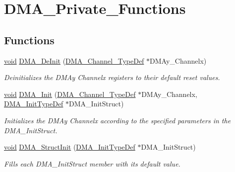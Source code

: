 \hypertarget{group___d_m_a___private___functions}{}\section{D\+M\+A\+\_\+\+Private\+\_\+\+Functions}
\label{group___d_m_a___private___functions}
\subsection*{Functions}
\begin{DoxyCompactItemize}
\item 
\hyperlink{usb__devapi_8h_afabf60e7f57651d6d595a02c75f07cd0}{void} \hyperlink{group___d_m_a___private___functions_ga21ca0d50b13e502db5ab5feb484f9ece}{D\+M\+A\+\_\+\+De\+Init} (\hyperlink{struct_d_m_a___channel___type_def}{D\+M\+A\+\_\+\+Channel\+\_\+\+Type\+Def} $\ast$D\+M\+Ay\+\_\+\+Channelx)
\begin{DoxyCompactList}\small\item\em Deinitializes the D\+M\+Ay Channelx registers to their default reset values. \end{DoxyCompactList}\item 
\hyperlink{usb__devapi_8h_afabf60e7f57651d6d595a02c75f07cd0}{void} \hyperlink{group___d_m_a___private___functions_ga7c3d1b9dc041f8e5f2cfc8d5dd858278}{D\+M\+A\+\_\+\+Init} (\hyperlink{struct_d_m_a___channel___type_def}{D\+M\+A\+\_\+\+Channel\+\_\+\+Type\+Def} $\ast$D\+M\+Ay\+\_\+\+Channelx, \hyperlink{struct_d_m_a___init_type_def}{D\+M\+A\+\_\+\+Init\+Type\+Def} $\ast$D\+M\+A\+\_\+\+Init\+Struct)
\begin{DoxyCompactList}\small\item\em Initializes the D\+M\+Ay Channelx according to the specified parameters in the D\+M\+A\+\_\+\+Init\+Struct. \end{DoxyCompactList}\item 
\hyperlink{usb__devapi_8h_afabf60e7f57651d6d595a02c75f07cd0}{void} \hyperlink{group___d_m_a___private___functions_ga0f7f95f750a90a6824f4e9b6f58adc7e}{D\+M\+A\+\_\+\+Struct\+Init} (\hyperlink{struct_d_m_a___init_type_def}{D\+M\+A\+\_\+\+Init\+Type\+Def} $\ast$D\+M\+A\+\_\+\+Init\+Struct)
\begin{DoxyCompactList}\small\item\em Fills each D\+M\+A\+\_\+\+Init\+Struct member with its default value. \end{DoxyCompactList}\item 

\end{DoxyCompactItemize}

